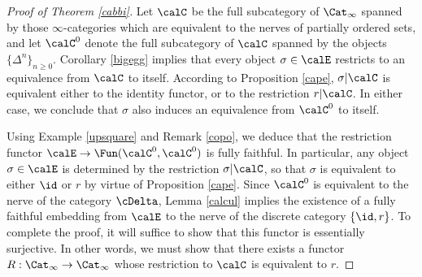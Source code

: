 \begin{proof}[Proof of Theorem \ref{cabbi}]
Let $\calC$ be the full subcategory of $\Cat_{\infty}$ spanned by those $\infty$-categories
which are equivalent to the nerves of partially ordered sets, and let $\calC^{0}$ denote the full subcategory of $\calC$ spanned by the objects $\{ \Delta^n \}_{n \geq 0}$. 
Corollary \ref{bigegg} implies that every object $\sigma \in \calE$ restricts to an equivalence from $\calC$ to itself. According to Proposition \ref{cape}, $\sigma| \calC$ is equivalent either to the identity functor, or to the restriction $r|\calC$. In either case, we conclude that $\sigma$ also induces an equivalence from $\calC^{0}$ to itself.

Using Example \ref{upsquare} and Remark \ref{copo}, we deduce that the restriction functor
$\calE \rightarrow \Fun(\calC^{0}, \calC^{0})$ is fully faithful. In particular, any object $\sigma \in \calE$ is determined by the restriction $\sigma | \calC$, so that $\sigma$ is equivalent to either $\id$ or
$r$ by virtue of Proposition \ref{cape}. Since $\calC^{0}$ is equivalent to the nerve of the category
$\cDelta$, Lemma \ref{calcul} implies the existence of a fully faithful embedding from
$\calE$ to the nerve of the discrete category $\{ \id, r \}$. To complete the proof, it will suffice to show that this functor is essentially surjective. In other words, we must show that there exists a functor
$R: \Cat_{\infty} \rightarrow \Cat_{\infty}$ whose restriction to $\calC$ is equivalent to $r$. 


\end{proof}
